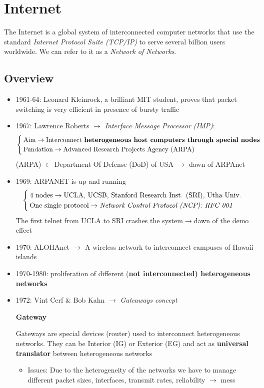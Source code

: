 \chapter{Internet}
The Internet is a global system of interconnected computer networks that use the standard \textit{Internet
Protocol Suite (TCP/IP)} to serve several billion users worldwide. We can refer to it as a \textit{Network of Networks}.
\section{Overview}
\begin{itemize}
\item 1961-64: Leonard Kleinrock, a brilliant MIT student, proves that packet switching is very efficient in presence of bursty traffic
\item 1967: Lawrence Roberts $\rightarrow$ \textit{Interface Message Processor (IMP)}: 
\begin{equation}
\begin{cases}
\text{Aim} \rightarrow \text{Interconnect \textbf{heterogeneous host computers through special nodes}}\\
\text{Fundation} \rightarrow \text{Advanced Research Projects Agency (ARPA)}
\end{cases}
\end{equation}
(ARPA) $\in$ Department Of Defense (DoD) of USA $\rightarrow$ dawn of ARPAnet
\item 1969: ARPANET is up and running
\begin{equation}
\begin{cases}
\text{4 nodes}\rightarrow \text{UCLA, UCSB, Stanford Research Inst. (SRI), Utha Univ.}\\
\text{One single protocol} \rightarrow \text{\textit{Network Control Protocol (NCP): RFC 001}} 
\end{cases}
\end{equation}
The first telnet from UCLA to SRI crashes the system$\rightarrow$dawn of the demo effect
\item 1970: ALOHAnet $\rightarrow$ A wireless network to interconnect campuses of Hawaii islands
\item 1970-1980: proliferation of different (\textbf{not interconnected) heterogeneous networks}
\item 1972: Vint Cerf $\&$ Bob Kahn $\rightarrow$ \textit{Gateaways concept}
\begin{definition}{\textbf{Gateway}}
\label{Gateway}

Gateways are special devices (router) used to interconnect heterogeneous networks. They can be Interior (IG) or Exterior (EG) and act as \textbf{universal translator} between heterogeneous networks
\end{definition}
\begin{itemize}
\item Issues: Due to the heterogeneity of the networks we have to manage different packet sizes, interfaces, transmit rates, reliability $\rightarrow$ mess


\end{itemize}
\end{itemize}

